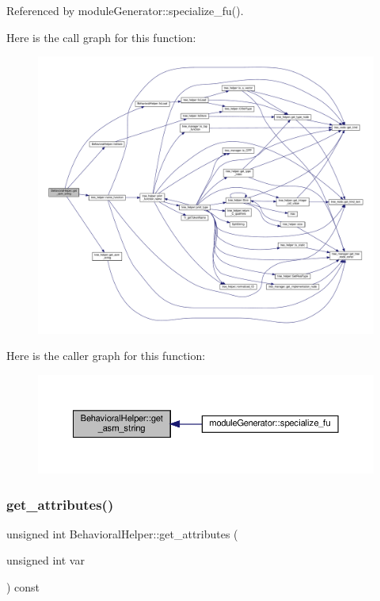 Referenced by module\+Generator\+::specialize\+\_\+fu().

Here is the call graph for this function\+:
\nopagebreak
\begin{figure}[H]
\begin{center}
\leavevmode
\includegraphics[width=350pt]{dd/db2/classBehavioralHelper_a29fb375c54f0dc9caa3559aff0ff1850_cgraph}
\end{center}
\end{figure}
Here is the caller graph for this function\+:
\nopagebreak
\begin{figure}[H]
\begin{center}
\leavevmode
\includegraphics[width=350pt]{dd/db2/classBehavioralHelper_a29fb375c54f0dc9caa3559aff0ff1850_icgraph}
\end{center}
\end{figure}
\mbox{\label{classBehavioralHelper_afb4630e8cd200f2989772d688b388632}} 
\subsubsection{\texorpdfstring{get\+\_\+attributes()}{get\_attributes()}}
{\footnotesize\ttfamily unsigned int Behavioral\+Helper\+::get\+\_\+attributes (\begin{DoxyParamCaption}\item[{unsigned int}]{var }\end{DoxyParamCaption}) const\hspace{0.3cm}{\ttfamily [virtual]}}



